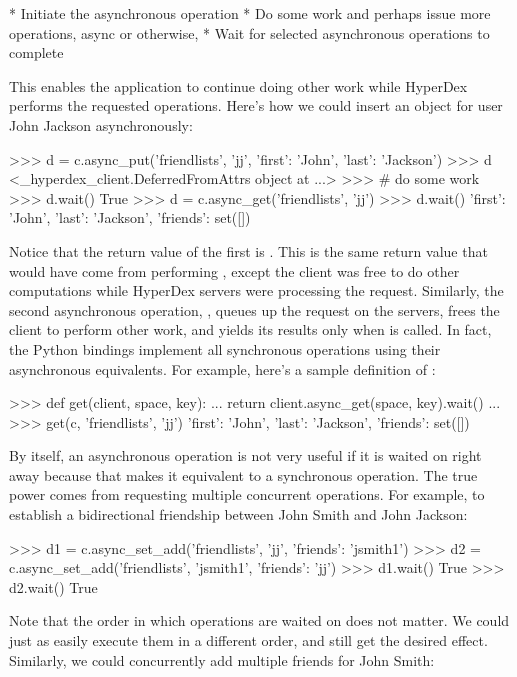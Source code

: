  * Initiate the asynchronous operation
 * Do some work and perhaps issue more operations, async or otherwise,
 * Wait for selected asynchronous operations to complete

This enables the application to continue doing other work while HyperDex
performs the requested operations.  Here's how we could insert an object for
user John Jackson asynchronously:

\begin{pythoncode}
>>> d = c.async_put('friendlists', 'jj', {'first': 'John', 'last': 'Jackson'})
>>> d
<_hyperdex_client.DeferredFromAttrs object at ...>
>>> # do some work
>>> d.wait()
True
>>> d = c.async_get('friendlists', 'jj')
>>> d.wait()
{'first': 'John', 'last': 'Jackson', 'friends': set([])}
\end{pythoncode}

Notice that the return value of the first  is .  This
is the same return value that would have come from performing ,
except the client was free to do other computations while HyperDex servers were
processing the  request.  Similarly, the second asynchronous
operation, , queues up the request on the servers, frees the
client to perform other work, and yields its results only when  is
called.  In fact, the Python bindings implement all synchronous operations using
their asynchronous equivalents.  For example, here's a sample definition of
:

\begin{pythoncode}
>>> def get(client, space, key):
...     return client.async_get(space, key).wait()
...
>>> get(c, 'friendlists', 'jj')
{'first': 'John', 'last': 'Jackson', 'friends': set([])}
\end{pythoncode}

By itself, an asynchronous operation is not very useful if it is waited on right
away because that makes it equivalent to a synchronous operation.  The true
power comes from requesting multiple concurrent operations.  For example, to
establish a bidirectional friendship between John Smith and John Jackson:

\begin{pythoncode}
>>> d1 = c.async_set_add('friendlists', 'jj', {'friends': 'jsmith1'})
>>> d2 = c.async_set_add('friendlists', 'jsmith1', {'friends': 'jj'})
>>> d1.wait()
True
>>> d2.wait()
True
\end{pythoncode}

Note that the order in which operations are waited on does not matter.  We could
just as easily execute them in a different order, and still get the desired
effect.  Similarly, we could concurrently add multiple friends for John Smith:

